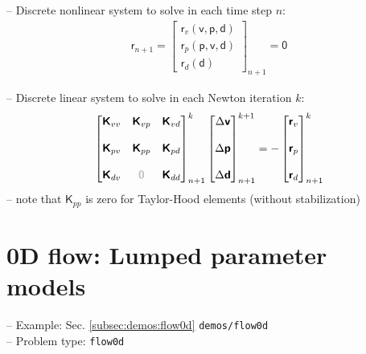 \documentclass[a4paper,12pt]{report}
\newcommand{\bs}[1]{\boldsymbol{#1}}
\newcommand{\zerom}{\textcolor{lightgray}{\bs{\mathsf{0}}}}
\newcommand{\ROP}{\bs{\mathsf{r}}}
\begin{document}
-- Discrete nonlinear system to solve in each time step $n$:
\begin{align}
\ROP_{n+1} = \begin{bmatrix} \ROP_{v}(\bs{\mathsf{v}},\bs{\mathsf{p}},\bs{\mathsf{d}}) \\ \ROP_{p}(\bs{\mathsf{p}},\bs{\mathsf{v}},\bs{\mathsf{d}}) \\ \ROP_{d}(\bs{\mathsf{d}}) \end{bmatrix}_{n+1} = \bs{\mathsf{0}}\label{eq:nonlin_sys_fluid_ale}
\end{align}

-- Discrete linear system to solve in each Newton iteration $k$:
\begin{align}
\begin{bmatrix} \bs{\mathsf{K}}_{vv} & \bs{\mathsf{K}}_{vp} & \bs{\mathsf{K}}_{vd} \\ \\ \bs{\mathsf{K}}_{pv} & \bs{\mathsf{K}}_{pp} & \bs{\mathsf{K}}_{pd} \\ \\ \bs{\mathsf{K}}_{dv}  & \zerom & \bs{\mathsf{K}}_{dd} \end{bmatrix}_{n+1}^{k}\begin{bmatrix} \Delta\bs{\mathsf{v}} \\ \\ \Delta\bs{\mathsf{p}} \\ \\ \Delta\bs{\mathsf{d}} \end{bmatrix}_{n+1}^{k+1}=-\begin{bmatrix} \ROP_{v} \\ \\ \ROP_{p} \\ \\ \ROP_{d} \end{bmatrix}_{n+1}^{k} \label{eq:lin_sys_fluid_ale}
\end{align}
-- note that $\bs{\mathsf{K}}_{pp}$ is zero for Taylor-Hood elements (without stabilization)


\section{0D flow: Lumped parameter models}\label{sec:flow0d}

-- Example: Sec. \ref{subsec:demos:flow0d} \verb"demos/flow0d"\\

-- Problem type: \verb.flow0d.\\
\end{document}
